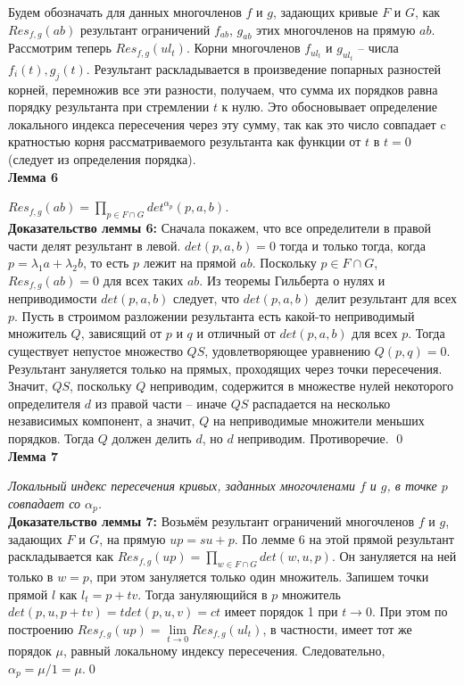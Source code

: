 \documentclass[a4paper, 12pt]{article}
\begin{document}
Будем обозначать для данных многочленов $f$ и $g$, задающих кривые $F$ и $G$, как $Res_{f,g}(ab)$ результант ограничений $f_{ab}$, $g_{ab}$ этих многочленов на прямую $ab$.\\

Рассмотрим теперь $Res_{f,g}(ul_t)$.  Корни многочленов $f_{ul_t}$ и $g_{ul_t}$ -- числа $f_i(t), g_j(t)$. Результант раскладывается в произведение попарных разностей корней, перемножив все эти разности, получаем, что сумма их порядков равна порядку результанта при стремлении $t$ к нулю.\newline
Это обосновывает определение локального индекса пересечения через эту сумму, так как это число совпадает c кратностью корня рассматриваемого результанта как функции от $t$ в $t=0$ (следует из определения порядка).\\

\textbf{Лемма 6}

\textit{$Res_{f,g}(ab) = \displaystyle\prod_{p \in F \cap G} det^{\alpha_p}(p,a,b)$.}\\

\textbf{Доказательство леммы 6:}\newline
Сначала покажем, что все определители в правой части делят результант в левой. $det(p,a,b) = 0$ тогда и только тогда, когда $p = \lambda_1 a + \lambda_2 b$, то есть $p$ лежит на прямой $ab$. Поскольку $p \in F \cap G$, $Res_{f,g}(ab)=0$ для всех таких $ab$. Из теоремы Гильберта о нулях и неприводимости $det(p,a,b)$ следует, что $det(p,a,b)$ делит результант для всех $p$.\newline
Пусть в строимом разложении результанта есть какой-то неприводимый множитель $Q$, зависящий от $p$ и $q$ и отличный от $det(p,a,b)$ для всех $p$. Тогда существует непустое множество $QS$, удовлетворяющее уравнению $Q(p,q)=0$. Результант зануляется только на прямых, проходящих через точки пересечения. Значит, $QS$, поскольку $Q$ неприводим, содержится в множестве нулей некоторого определителя $d$ из правой части -- иначе $QS$ распадается на несколько независимых компонент, а значит, $Q$ на неприводимые множители меньших порядков. Тогда $Q$ должен делить $d$, но $d$ неприводим. Противоречие.
\qed\\

\textbf{Лемма 7}

\textit{Локальный индекс пересечения кривых, заданных многочленами $f$ и $g$, в точке $p$ совпадает со $\alpha_p$.}\\

\textbf{Доказательство леммы 7:}\newline
Возьмём результант ограничений многочленов $f$ и $g$, задающих $F$ и $G$, на прямую $up={su + p}$. По лемме 6 на этой прямой результант раскладывается как $Res_{f,g}(up) = \displaystyle\prod_{w \in F \cap G} det(w,u,p)$. Он зануляется на ней только в $w=p$, при этом зануляется только один множитель. Запишем точки прямой $l$ как $l_t = p + tv$. Тогда зануляющийся в $p$ множитель $det(p,u,p+tv) = tdet(p,u,v) = ct$ имеет порядок 1 при $t \rightarrow 0$. При этом по построению $Res_{f,g}(up) = \lim\limits_{t \to 0}Res_{f,g}(ul_t)$, в частности, имеет тот же порядок $\mu$, равный локальному индексу пересечения. Следовательно, $\alpha_p = \mu / 1 = \mu$.\qed\\
\end{document}
